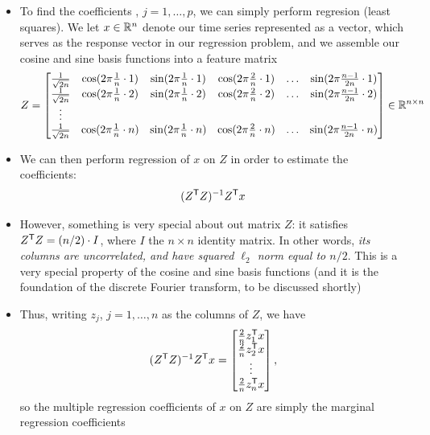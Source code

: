 \documentclass{article}
\begin{document}
\begin{itemize}
\item To find the coefficients , $j = 1,\dots,p$,
  we can simply perform regresion (least squares). We let $x \in \mathbb{R}^n$ denote
  our time series represented as a vector, which serves as the response vector
  in our regression problem, and we assemble our cosine and sine basis functions
  into a feature matrix  
  \[
  Z = \begin{bmatrix}
  \frac{1}{\sqrt{2n}} & \cos(2\pi \frac{1}{n} \cdot 1) & \sin(2\pi \frac{1}{n}
  \cdot 1) & \cos(2\pi \frac{2}{n} \cdot 1) & \dots & \sin(2\pi \frac{n-1}{2n}
  \cdot 1) \\  
  \frac{1}{\sqrt{2n}}  & \cos(2\pi \frac{1}{n} \cdot 2) & \sin(2\pi \frac{1}{n}
  \cdot 2) & \cos(2\pi \frac{2}{n} \cdot 2) & \dots & \sin(2\pi \frac{n-1}{2n}
  \cdot 2) \\  
  \vdots & & & & & \\
  \frac{1}{\sqrt{2n}}  & \cos(2\pi \frac{1}{n} \cdot n) & \sin(2\pi \frac{1}{n}
  \cdot n) & \cos(2\pi \frac{2}{n} \cdot n) & \dots & \sin(2\pi \frac{n-1}{2n}
  \cdot n)  
  \end{bmatrix} \in \mathbb{R}^{n \times n}
  \]

\item We can then perform regression of $x$ on $Z$ in order to estimate the
  coefficients: 
  \[
  (Z^{\mathsf{T}} Z)^{-1} Z^{\mathsf{T}} x
  \]

\item However, something is very special about out matrix $Z$: it satisfies 
  $Z^{\mathsf{T}} Z = (n/2) \cdot I$, where $I$ the $n \times n$ identity matrix. In other
  words, \emph{its columns are uncorrelated, and have squared $\ell_2$ norm
    equal to $n/2$}. This is a very special property of the cosine and sine
  basis functions (and it is the foundation of the discrete Fourier transform,
  to be discussed shortly)
    
\item Thus, writing $z_j$, $j = 1,\dots,n$ as the columns of $Z$, we have
  \renewcommand{\arraystretch}{1.3} 
  \[
  (Z^{\mathsf{T}} Z)^{-1} Z^{\mathsf{T}} x = \begin{bmatrix} \frac{2}{n} z_1^{\mathsf{T}} x \\ \frac{2}{n}
    z_2^{\mathsf{T}} x \\ \vdots \\ \frac{2}{n} z_n^{\mathsf{T}}  x \end{bmatrix},
  \]
 \renewcommand{\arraystretch}{1} 
  so the multiple regression coefficients of $x$ on $Z$ are simply the marginal
  regression coefficients


\end{itemize}
\end{document}
